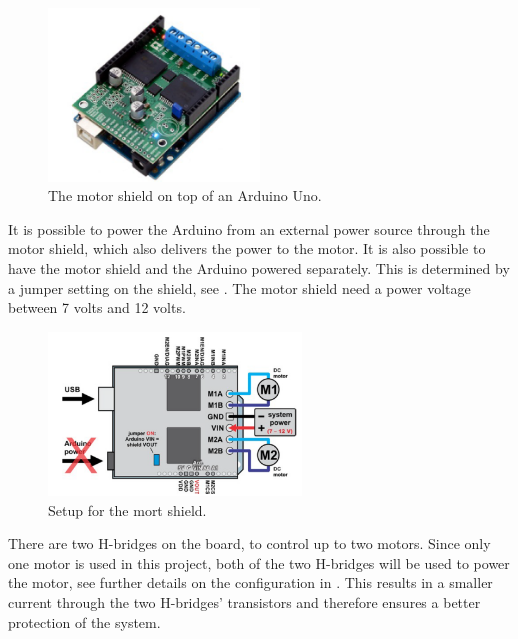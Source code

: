 \begin{figure}[H]
	\centering
	\includegraphics[width=0.50\textwidth]{figures/Motordriver.png}
		\caption{The motor shield on top of an Arduino Uno.\cite{DriverShield}} 
	\label{MotorDrive}
\end{figure}\vspace{-5mm}

It is possible to power the Arduino from an external power source through the motor shield, which also delivers the power to the motor. It is also possible to have the motor shield and the Arduino powered separately. This is determined by a jumper setting on the shield, see . The motor shield need a power voltage between 7 volts and 12 volts.\cite{PCorporation}

\begin{figure}[H]
	\centering
	\includegraphics[width=0.60\textwidth]{figures/MotordriverIO.png}
		\caption{Setup for the mort shield.\cite{DriverShield}}
	\label{MotorDriveIO}
\end{figure}\vspace{-5mm}

There are two H-bridges on the board, to control up to two motors. Since only one motor is used in this project, both of the two H-bridges will be used to power the motor, see further details on the configuration in . This results in a smaller current through the two H-bridges' transistors and therefore ensures a better protection of the system.\cite{PCorporation}

